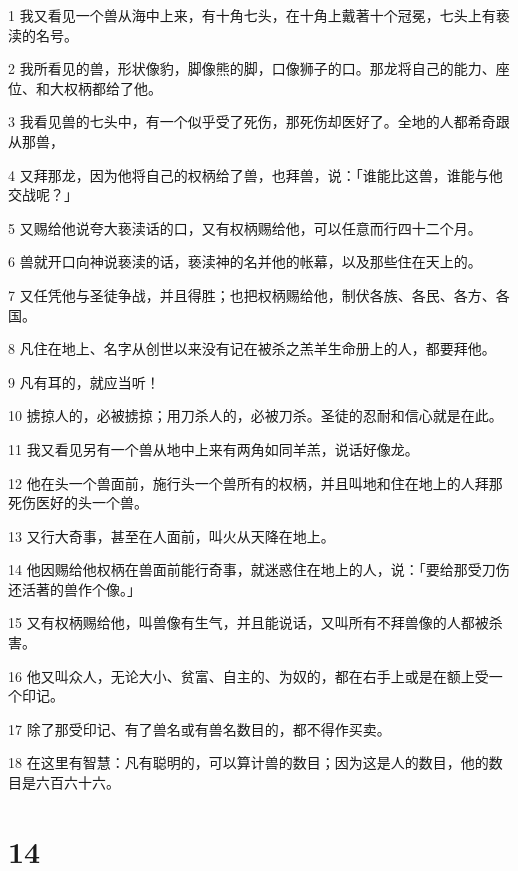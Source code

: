 \par 1 我又看见一个兽从海中上来，有十角七头，在十角上戴著十个冠冕，七头上有亵渎的名号。
\par 2 我所看见的兽，形状像豹，脚像熊的脚，口像狮子的口。那龙将自己的能力、座位、和大权柄都给了他。
\par 3 我看见兽的七头中，有一个似乎受了死伤，那死伤却医好了。全地的人都希奇跟从那兽，
\par 4 又拜那龙，因为他将自己的权柄给了兽，也拜兽，说：「谁能比这兽，谁能与他交战呢？」
\par 5 又赐给他说夸大亵渎话的口，又有权柄赐给他，可以任意而行四十二个月。
\par 6 兽就开口向神说亵渎的话，亵渎神的名并他的帐幕，以及那些住在天上的。
\par 7 又任凭他与圣徒争战，并且得胜；也把权柄赐给他，制伏各族、各民、各方、各国。
\par 8 凡住在地上、名字从创世以来没有记在被杀之羔羊生命册上的人，都要拜他。
\par 9 凡有耳的，就应当听！
\par 10 掳掠人的，必被掳掠；用刀杀人的，必被刀杀。圣徒的忍耐和信心就是在此。
\par 11 我又看见另有一个兽从地中上来有两角如同羊羔，说话好像龙。
\par 12 他在头一个兽面前，施行头一个兽所有的权柄，并且叫地和住在地上的人拜那死伤医好的头一个兽。
\par 13 又行大奇事，甚至在人面前，叫火从天降在地上。
\par 14 他因赐给他权柄在兽面前能行奇事，就迷惑住在地上的人，说：「要给那受刀伤还活著的兽作个像。」
\par 15 又有权柄赐给他，叫兽像有生气，并且能说话，又叫所有不拜兽像的人都被杀害。
\par 16 他又叫众人，无论大小、贫富、自主的、为奴的，都在右手上或是在额上受一个印记。
\par 17 除了那受印记、有了兽名或有兽名数目的，都不得作买卖。
\par 18 在这里有智慧：凡有聪明的，可以算计兽的数目；因为这是人的数目，他的数目是六百六十六。

\chapter{14}

